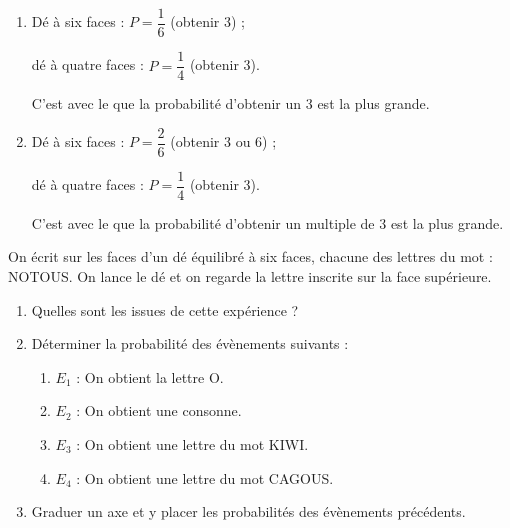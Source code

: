 \begin{Maquette}[Fiche,CorrigeFin,Colonnes=2]{}
\begin{multicols}{2}
      \begin{Solution}
         \begin{enumerate}
            \item Dé à six faces : $P =\dfrac16$ (obtenir 3) ; \par
               dé à quatre faces : $P =\dfrac14$ (obtenir 3). \par \smallskip
               C'est avec le  que la probabilité d'obtenir un 3 est la plus grande.
            \item Dé à six faces : $ P =\dfrac26$ (obtenir 3 ou 6) ; \par
               dé à quatre faces : $P =\dfrac14$ (obtenir 3). \par  \smallskip
               C'est avec le  que la probabilité d'obtenir un multiple de 3 est la plus grande.
         \end{enumerate}
      \end{Solution}
      
      
      \begin{exercice}[Dur] %
         On écrit sur les faces d’un dé équilibré à six faces, chacune des lettres du mot : NOTOUS. On lance le dé et on regarde la lettre inscrite sur la face supérieure.
         \begin{enumerate}
            \item Quelles sont les issues de cette expérience ?
            \item Déterminer la probabilité des évènements suivants :
            \begin{enumerate}
               \item $E_1$ : \og On obtient la lettre O. \fg
               \item $E_2$ : \og On obtient une consonne. \fg
               \item $E_3$ : \og On obtient une lettre du mot KIWI. \fg
               \item $E_4$ : \og On obtient une lettre du mot CAGOUS. \fg
            \end{enumerate}
            \item Graduer un axe et y placer les probabilités des évènements précédents.
         \end{enumerate}
      \end{exercice}
      

\end{multicols}
\end{Maquette}
